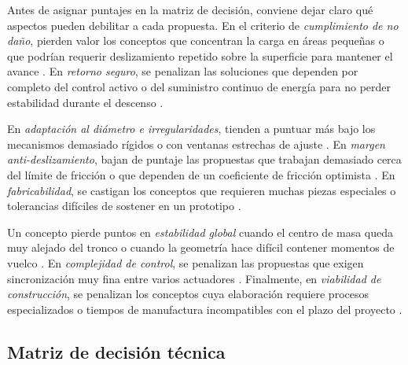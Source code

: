 \documentclass[lettersize,journal]{IEEEtran}
\begin{document}
Antes de asignar puntajes en la matriz de decisión, conviene dejar claro qué aspectos
pueden debilitar a cada propuesta. En el criterio de \emph{cumplimiento de no daño},
pierden valor los conceptos que concentran la carga en áreas pequeñas o que podrían
requerir deslizamiento repetido sobre la superficie para mantener el avance
\cite{Vasiliauskas2001ForestryDamage}. En \emph{retorno seguro}, se penalizan las
soluciones que dependen por completo del control activo o del suministro continuo de
energía para no perder estabilidad durante el descenso
\cite{FaurouxMorillon2010SelfLock}.

En \emph{adaptación al diámetro e irregularidades}, tienden a puntuar más bajo los
mecanismos demasiado rígidos o con ventanas estrechas de ajuste \cite{Amaran2021}. En
\emph{margen anti-deslizamiento}, bajan de puntaje las propuestas que trabajan
demasiado cerca del límite de fricción o que dependen de un coeficiente de fricción
optimista \cite{KaiserEtAl2024ElastomerFriction}. En \emph{fabricabilidad}, se castigan los conceptos que requieren muchas piezas especiales o tolerancias difíciles de sostener en un prototipo \cite{UlrichEppinger2012}.

Un concepto pierde puntos en \emph{estabilidad global} cuando el centro de masa queda
muy alejado del tronco o cuando la geometría hace difícil contener momentos de vuelco
\cite{Sadeghi2012HumanInspired}. En \emph{complejidad de control}, se penalizan las
propuestas que exigen sincronización muy fina entre varios actuadores
\cite{GuiTangMukhopadhyay2018}. Finalmente, en \emph{viabilidad de construcción}, se
penalizan los conceptos cuya elaboración requiere procesos especializados o tiempos de
manufactura incompatibles con el plazo del proyecto \cite{DubeyEtAl2016Coconut}.

\subsection{\textbf{Matriz de decisión técnica}}
\end{document}
